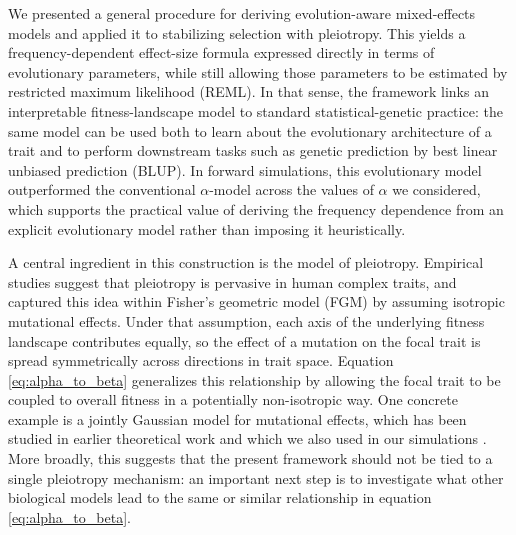 \documentclass[10pt]{article}
\begin{document}
We presented a general procedure for deriving evolution-aware mixed-effects models and applied it to stabilizing selection with pleiotropy. This yields a frequency-dependent effect-size formula expressed directly in terms of evolutionary parameters, while still allowing those parameters to be estimated by restricted maximum likelihood (REML). In that sense, the framework links an interpretable fitness-landscape model to standard statistical-genetic practice: the same model can be used both to learn about the evolutionary architecture of a trait and to perform downstream tasks such as genetic prediction by best linear unbiased prediction (BLUP). In forward simulations, this evolutionary model outperformed the conventional $\alpha$-model across the values of $\alpha$ we considered, which supports the practical value of deriving the frequency dependence from an explicit evolutionary model rather than imposing it heuristically.

A central ingredient in this construction is the model of pleiotropy. Empirical studies suggest that pleiotropy is pervasive in human complex traits, and \citet{Simons2018popgeninterpretation} captured this idea within Fisher's geometric model (FGM) by assuming isotropic mutational effects. Under that assumption, each axis of the underlying fitness landscape contributes equally, so the effect of a mutation on the focal trait is spread symmetrically across directions in trait space. Equation \eqref{eq:alpha_to_beta} generalizes this relationship by allowing the focal trait to be coupled to overall fitness in a potentially non-isotropic way. One concrete example is a jointly Gaussian model for mutational effects, which has been studied in earlier theoretical work and which we also used in our simulations \citep{Kimura_1964, B_rger_1986, burger2000themathematicaltheoryof, walsh2018evolutionandselectionof}. More broadly, this suggests that the present framework should not be tied to a single pleiotropy mechanism: an important next step is to investigate what other biological models lead to the same or similar relationship in equation \eqref{eq:alpha_to_beta}.
\end{document}
